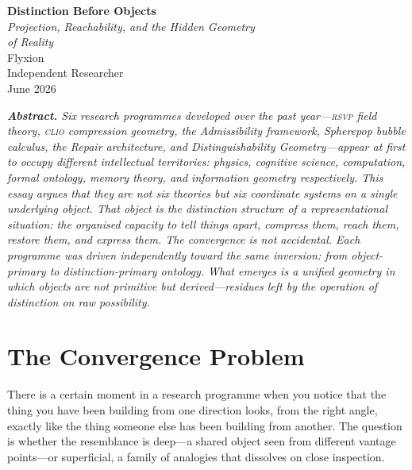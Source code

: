 \documentclass[12pt, letterpaper]{article}
\theoremstyle{remark}
\newcommand{\rsvp}{\textsc{rsvp}}
\newcommand{\clio}{\textsc{clio}}
\begin{document}
\begin{titlepage}
\vspace*{1.8cm}
\begin{center}
{\LARGE\bfseries Distinction Before Objects}\\[0.5em]
{\large\itshape Projection, Reachability, and the Hidden Geometry\\[0.2em]
of Reality}\\[2.2em]
{\normalsize Flyxion}\\[0.5em]
{\small Independent Researcher}\\[1.8em]
{\small June 2026}\\[3em]
\begin{minipage}{0.80\textwidth}
\small\itshape
\textbf{Abstract.}
Six research programmes developed over the past year---\rsvp{} field theory,
\clio{} compression geometry, the Admissibility framework, Spherepop bubble
calculus, the Repair architecture, and Distinguishability Geometry---appear
at first to occupy different intellectual territories: physics, cognitive
science, computation, formal ontology, memory theory, and information
geometry respectively.  This essay argues that they are not six theories
but six coordinate systems on a single underlying object.  That object is
the \emph{distinction structure of a representational situation}: the
organised capacity to tell things apart, compress them, reach them, restore
them, and express them.  The convergence is not accidental.  Each programme
was driven independently toward the same inversion: from object-primary to
distinction-primary ontology.  What emerges is a unified geometry in which
objects are not primitive but derived---residues left by the operation of
distinction on raw possibility.
\end{minipage}
\end{center}
\end{titlepage}

\tableofcontents
\newpage

\section{The Convergence Problem}

There is a certain moment in a research programme when you notice that
the thing you have been building from one direction looks, from the right
angle, exactly like the thing someone else has been building from another.
The question is whether the resemblance is deep---a shared object seen from
different vantage points---or superficial, a family of analogies that
dissolves on close inspection.
\end{document}

